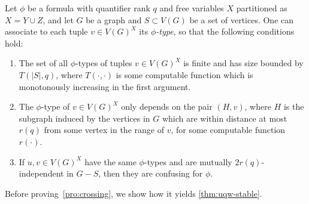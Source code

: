 \begin{proposition}\label{pro:crossing}	
	Let $\phi$ be a formula with
 quantifier rank $q$ and
   free variables $X$
 partitioned as $X=Y\cup Z$, and let $G$ be a graph and $S\subset V(G)$ be a set of vertices.
One can associate to each tuple $v\in V(G)^X$
its \emph{$\phi$-type}, so that the following conditions 
hold:
	 \begin{enumerate}		 
	 	\item The  set of all $\phi$-types  of tuples $v\in V(G)^X$  is finite and has size bounded by 
    $T(|S|,q)$, where $T(\cdot,\cdot)$ is some computable function which is monotonously increasing in the first argument.
		
		\item The $\phi$-type of $v\in V(G)^X$ only depends on the pair $(H,v)$, where $H$ is the subgraph induced by the vertices in $G$ 
    which are within distance at most  $r(q)$  from some vertex in the range of $v$, for some computable function $r(\cdot)$.

		
	 	\item 
  If $u,v\in V(G)^X$ have the same $\phi$-types and are mutually $2r(q)$-independent in $G-S$, then they are confusing for $\phi$.
	 \end{enumerate}
\end{proposition}

Before proving~\cref{pro:crossing}, we show how it yields  \cref{thm:uqw-stable}. 

